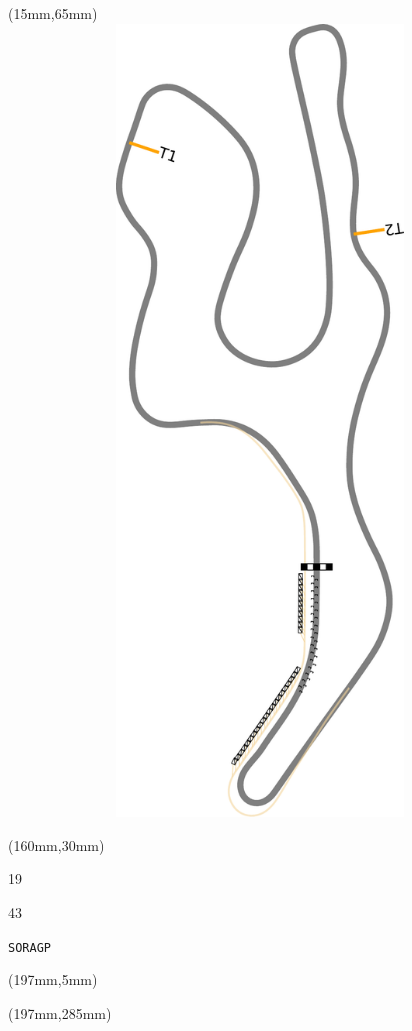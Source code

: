 \begin{textblock*}{185mm}(15mm,65mm)%
\centering
\mbox{\includegraphics[width=185mm,height=210mm,keepaspectratio]{PT/SORAGP.pdf}}
\end{textblock*}
\begin{textblock*}{40mm}(160mm,30mm)%
\Large
\par{} 
\par19 
\par43 
\par\hfill\tiny\tt SORAGP\\
\end{textblock*}
\begin{textblock*}{20mm}(197mm,5mm)%
\fbox{\thepage}
\label{SORAGP}
\end{textblock*}
\begin{textblock*}{20mm}(197mm,285mm)%
\fbox{\thepage}
\end{textblock*}

